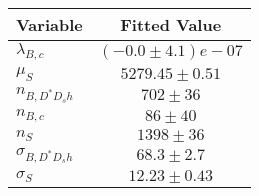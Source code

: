 \begin{tabular}[t]{lc}
\hline
Variable &Fitted Value\\
\hline\hline
$\lambda_{B,c}$&$(-0.0\pm4.1)e-07$\\
\hline
$\mu_S$&$5279.45\pm0.51$\\
\hline
$n_{B, D^* D_s h}$&$702\pm36$\\
\hline
$n_{B,c}$&$86\pm40$\\
\hline
$n_S$&$1398\pm36$\\
\hline
$\sigma_{B, D^* D_s h}$&$68.3\pm2.7$\\
\hline
$\sigma_S$&$12.23\pm0.43$\\
\hline
\end{tabular}